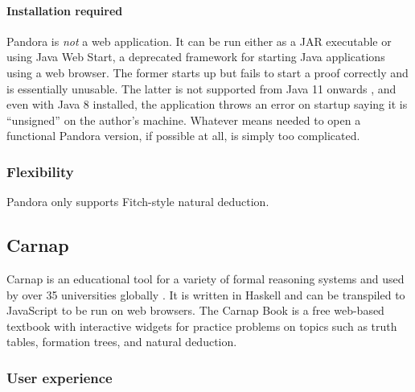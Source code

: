 \paragraph{Installation required}
Pandora is \textit{not} a web application. It can be run either as a JAR executable or using Java Web Start, a deprecated framework for starting Java applications using a web browser. The former starts up but fails to start a proof correctly and is essentially unusable. The latter is not supported from Java 11 onwards \cite{oracle:2020}, and even with Java 8 installed, the application throws an error on startup saying it is ``unsigned'' on the author's machine. Whatever means needed to open a functional Pandora version, if possible at all, is simply too complicated.

\subsubsection{Flexibility}
Pandora only supports Fitch-style natural deduction.

\subsection{Carnap}
Carnap \cite{carnap, carnap:2018} is an educational tool for a variety of formal reasoning systems and used by over 35 universities globally \cite{carnap:about}. It is written in Haskell and can be transpiled to JavaScript to be run on web browsers. The Carnap Book \cite{carnap:book} is a free web-based textbook with interactive widgets for practice problems on topics such as truth tables, formation trees, and natural deduction.

\subsubsection{User experience}

